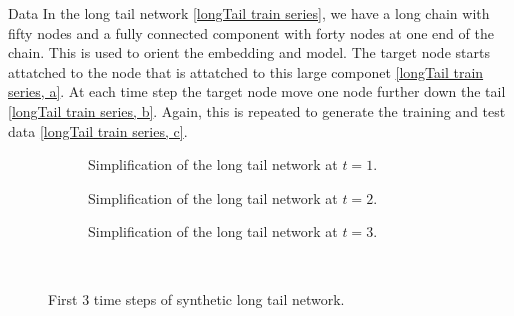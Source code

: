 \documentclass{article}
\begin{document}
\begin{section}{Data}
    In the long tail network \autoref{longTail train series}, we have a long chain with fifty nodes and a fully connected component with forty nodes at one end of the chain. This is used to orient the embedding and model. The target node starts attatched to the node that is attatched to this large componet \autoref{longTail train series, a}. At each time step the target node move one node further down the tail \autoref{longTail train series, b}. Again, this is repeated to generate the training and test data \autoref{longTail train series, c}.
    \begin{figure}[H]
        \centering
        \begin{subfigure}[c]{0.3\textwidth}
            \centering
            \resizebox{.6\width}{!}{}
            \caption{Simplification of the long tail network at $t=1$.}
            \label{longTail train series, a}
        \end{subfigure}
        \hfill
        \centering
        \begin{subfigure}[c]{0.3\textwidth}
            \centering
            \resizebox{.6\width}{!}{}
            \caption{Simplification of the long tail network at $t=2$.}
            \label{longTail train series, b}
        \end{subfigure}
        \hfill
        \centering
        \begin{subfigure}[c]{0.3\textwidth}
            \centering
            \resizebox{.6\width}{!}{}
            \caption{Simplification of the long tail network at $t=3$.}
            \label{longTail train series, c}
        \end{subfigure}\\
        \caption{First 3 time steps of synthetic long tail network.}
        \label{longTail train series}
    \end{figure}    



\end{section}
\end{document}
